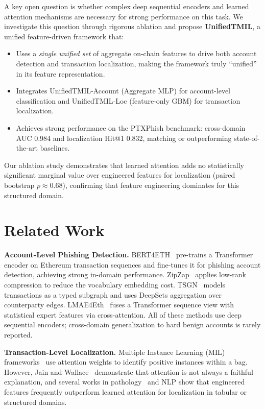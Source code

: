 \documentclass[conference]{IEEEtran}
\newcommand{\ours}{UnifiedTMIL}
\begin{document}
A key open question is whether complex deep sequential encoders and learned attention mechanisms are necessary for strong performance on this task. We investigate this question through rigorous ablation and propose \textbf{\ours{}}, a unified feature-driven framework that:
\begin{itemize}
    \item Uses a \emph{single unified set} of aggregate on-chain features to drive both account detection and transaction localization, making the framework truly ``unified'' in its feature representation.
    \item Integrates \ours{}-Account (Aggregate MLP) for account-level classification and \ours{}-Loc (feature-only GBM) for transaction localization.
    \item Achieves strong performance on the PTXPhish benchmark: cross-domain AUC 0.984 and localization Hit@1 0.832, matching or outperforming state-of-the-art baselines.
\end{itemize}

Our ablation study demonstrates that learned attention adds no statistically significant marginal value over engineered features for localization (paired bootstrap $p \approx 0.68$), confirming that feature engineering dominates for this structured domain.

\section{Related Work}\label{sec:related}

\textbf{Account-Level Phishing Detection.} BERT4ETH~\cite{bert4eth} pre-trains a Transformer encoder on Ethereum transaction sequences and fine-tunes it for phishing account detection, achieving strong in-domain performance. ZipZap~\cite{zipzap} applies low-rank compression to reduce the vocabulary embedding cost. TSGN~\cite{tsgn} models transactions as a typed subgraph and uses DeepSets aggregation over counterparty edges. LMAE4Eth~\cite{lmae4eth} fuses a Transformer sequence view with statistical expert features via cross-attention. All of these methods use deep sequential encoders; cross-domain generalization to hard benign accounts is rarely reported.

\textbf{Transaction-Level Localization.} Multiple Instance Learning (MIL) frameworks~\cite{ilse2018, transmil, clam} use attention weights to identify positive instances within a bag. However, Jain and Wallace~\cite{jain2019} demonstrate that attention is not always a faithful explanation, and several works in pathology~\cite{clam} and NLP show that engineered features frequently outperform learned attention for localization in tabular or structured domains.
\end{document}
